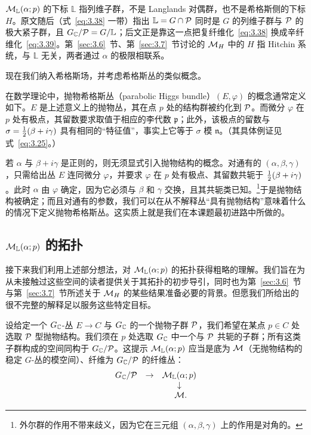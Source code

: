 \begin{yizhu}[易错点]${\mathcal{M}}_\mathbb{L}(\alpha;p)$ 的下标 $\mathbb{L}$ 指列维子群，不是 Langlands 对偶群，也不是希格斯侧的下标 $H$。原文随后（式~\eqref{eq:3.38} 一带）指出 $\mathbb{L}=G\cap\mathcal{P}$ 同时是 $G$ 的列维子群与 $\mathcal{P}$ 的极大紧子群，且 $G_{\mathbb{C}}/\mathcal{P}=G/\mathbb{L}$；后文正是靠这一点把复纤维化~\eqref{eq:3.38} 换成辛纤维化~\eqref{eq:3.39}。第~\ref{sec:3.6}~节、第~\ref{sec:3.7}~节讨论的 ${{\mathcal{M}}_H}$ 中的 $H$ 指 Hitchin 系统，与 $\mathbb{L}$ 无关，两者通过 $\alpha$ 的极限相联系。\end{yizhu}

\bigskip{}

现在我们纳入希格斯场，并考虑希格斯丛的类似概念。

在数学理论中，抛物希格斯丛（parabolic Higgs bundle）$(E,\varphi)$ 的概念通常定义如下。$E$ 是上述意义上的抛物丛，其在点 $p$ 处的结构群被约化到 $\mathcal{P}$。而微分 $\varphi$ 在 $p$ 处有极点，其留数要求取值于相应的李代数 $\mathfrak p$；此外，该极点的留数与 $\sigma=\frac{1}{2}(\beta+i\gamma)$ 具有相同的“特征值”，事实上它等于 $\sigma$ 模 $\mathfrak n$。（其具体例证见式~\eqref{eq:3.25}。）

若 $\alpha$ 与 $\beta+i\gamma$ 是正则的，则无须显式引入抛物结构的概念。对通有的 $(\alpha,\beta,\gamma)$，只需给出丛 $E$ 连同微分 $\varphi$，并要求 $\varphi$ 在 $p$ 处有极点、其留数共轭于 $\frac{1}{2}(\beta+i\gamma)$。此时 $\alpha$ 由 $\varphi$ 确定，因为它必须与 $\beta$ 和 $\gamma$ 交换，且其共轭类已知。\footnote{外尔群的作用不带来歧义，因为它在三元组 $(\alpha,\beta,\gamma)$ 上的作用是对角的。}于是抛物结构被确定；而且对通有的参数，我们可以在从不解释丛“具有抛物结构”意味着什么的情况下定义抛物希格斯丛。这实质上就是我们在本课题最初进路中所做的。

\subsection{\texorpdfstring{${\mathcal{M}}_\mathbb{L}(\alpha;p)$ 的拓扑}{M_L(α;p) 的拓扑}}

\label{sec:3.5}

接下来我们利用上述部分想法，对 ${\mathcal{M}}_\mathbb{L}(\alpha;p)$ 的拓扑获得粗略的理解。我们旨在为从未接触过这些空间的读者提供关于其拓扑的初步导引，同时也为第~\ref{sec:3.6}~节与第~\ref{sec:3.7}~节所述关于 ${{\mathcal{M}}_H}$ 的某些结果准备必要的背景。但愿我们所给出的很不完整的解释足以服务这些特定目标。

设给定一个 $G_{\mathbb{C}}$-丛 $E\to C$ 与 $G_{\mathbb{C}}$ 的一个抛物子群 $\mathcal{P}$，我们希望在某点 $p\in C$ 处选取 $\mathcal{P}$ 型抛物结构。我们须在 $p$ 处选取 $G_{\mathbb{C}}$ 中一个与 $\mathcal{P}$ 共轭的子群；所有这类子群构成的空间同构于 $G_{\mathbb{C}}/\mathcal{P}$。这提示 ${\mathcal{M}}_\mathbb{L}(\alpha;p)$ 应当是底为 ${\mathcal{M}}$（无抛物结构的稳定 $G$-丛的模空间）、纤维为 $G_{\mathbb{C}}/\mathcal{P}$ 的纤维丛：
\setcounter{equation}{37}
\begin{equation}\label{eq:3.38}
  \begin{matrix}G_{\mathbb{C}}/\mathcal{P}&\to&
{\mathcal{M}}_\mathbb{L}(\alpha;p)\\
                                &   & \downarrow \\
                                & & ~{\mathcal{M}}. \end{matrix}
\end{equation}

